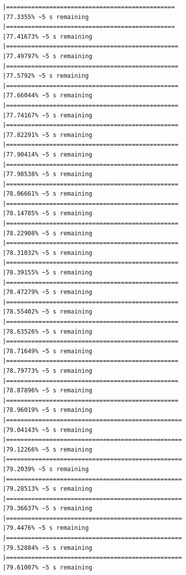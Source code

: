 \documentclass{article}\usepackage[]{graphicx}\usepackage[]{xcolor}
\makeatletter
\newenvironment{kframe}{%
 \def\at@end@of@kframe{}%
 \ifinner\ifhmode%
  \def\at@end@of@kframe{\end{minipage}}%
  \begin{minipage}{\columnwidth}%
 \fi\fi%
 \def\FrameCommand##1{\hskip\@totalleftmargin \hskip-\fboxsep
 \colorbox{shadecolor}{##1}\hskip-\fboxsep
     \hskip-\linewidth \hskip-\@totalleftmargin \hskip\columnwidth}%
 \MakeFramed {\advance\hsize-\width
   \@totalleftmargin\z@ \linewidth\hsize
   \@setminipage}}%
 {\par\unskip\endMakeFramed%
 \at@end@of@kframe}
\newenvironment{knitrout}{}{} %
\makeatother
\begin{document}
\begin{knitrout}
\begin{kframe}
\begin{verbatim}
|===============================================               |77.3355% ~5 s remaining   
|===============================================               |77.41673% ~5 s remaining  
|================================================              |77.49797% ~5 s remaining  
|================================================              |77.5792% ~5 s remaining   
|================================================              |77.66044% ~5 s remaining  
|================================================              |77.74167% ~5 s remaining  
|================================================              |77.82291% ~5 s remaining  
|================================================              |77.90414% ~5 s remaining  
|================================================              |77.98538% ~5 s remaining  
|================================================              |78.06661% ~5 s remaining  
|================================================              |78.14785% ~5 s remaining  
|================================================              |78.22908% ~5 s remaining  
|================================================              |78.31032% ~5 s remaining  
|================================================              |78.39155% ~5 s remaining  
|================================================              |78.47279% ~5 s remaining  
|================================================              |78.55402% ~5 s remaining  
|================================================              |78.63526% ~5 s remaining  
|================================================              |78.71649% ~5 s remaining  
|================================================              |78.79773% ~5 s remaining  
|================================================              |78.87896% ~5 s remaining  
|================================================              |78.96019% ~5 s remaining  
|=================================================             |79.04143% ~5 s remaining  
|=================================================             |79.12266% ~5 s remaining  
|=================================================             |79.2039% ~5 s remaining   
|=================================================             |79.28513% ~5 s remaining  
|=================================================             |79.36637% ~5 s remaining  
|=================================================             |79.4476% ~5 s remaining   
|=================================================             |79.52884% ~5 s remaining  
|=================================================             |79.61007% ~5 s remaining  

\end{verbatim}
\end{kframe}
\end{knitrout}
\end{document}
